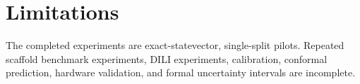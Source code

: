 \section{Limitations}
The completed experiments are exact-statevector, single-split pilots. Repeated
scaffold benchmark experiments, DILI experiments, calibration, conformal
prediction, hardware validation, and formal uncertainty intervals are incomplete.
